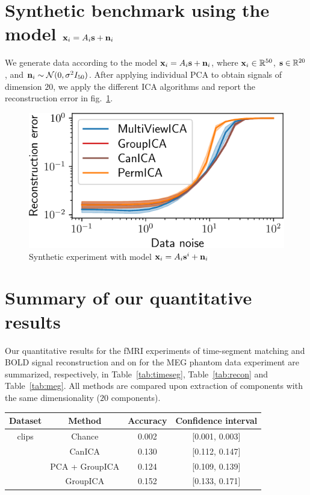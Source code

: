 \documentclass{report}
\begin{document}
{\section{Synthetic benchmark using the model $\mathbf{x}_i = A_i\mathbf{s} + \mathbf{n}_i$}
\label{app:complex_cov}
We generate data according to the model $\mathbf{x}_i = A_i\mathbf{s} + \mathbf{n}_i$, where $\mathbf{x}_i \in \mathbb{R}^{50}$, $\mathbf{s} \in \mathbb{R}^{20}$, and $\mathbf{n}_i\sim \mathcal{N}(0, \sigma^2 I_{50})$. After applying individual PCA to obtain signals of dimension $20$, we apply the different ICA algorithms and report the reconstruction error in fig.~\ref{fig:reconstruction_synth}.

\begin{figure}
  \center
  \includegraphics[width=0.5\linewidth]{figures/mvica/distance.pdf}
  \caption{Synthetic experiment with model $\mathbf{x}_i = A_i\mathbf{s}^i + \mathbf{n}_i$} %
  \label{fig:reconstruction_synth}
\end{figure}

\section{Summary of our quantitative results}
\label{sec:app_real_data}
Our quantitative results for the fMRI experiments of time-segment matching and BOLD signal reconstruction and on for the MEG phantom data experiment are summarized, respectively, in Table~\ref{tab:timeseg}, Table~\ref{tab:recon} and Table~\ref{tab:meg}. All methods are compared upon extraction of components with the same dimensionality ($20$ components).

\begin{table}
    \centering
    \begin{tabular}{|c|c | c | c|}
            \hline
         \textbf{Dataset} & \textbf{Method} & \textbf{Accuracy} & \textbf{Confidence interval} \\
         \hline
clips   & Chance      & 0.002&[0.001, 0.003] \\
        & CanICA    & 0.130&[0.112, 0.147] \\
        & PCA + GroupICA      & 0.124&[0.109, 0.139] \\
        & GroupICA    & 0.152&[0.133, 0.171] \\


\end{tabular}
\end{table}}
\end{document}
